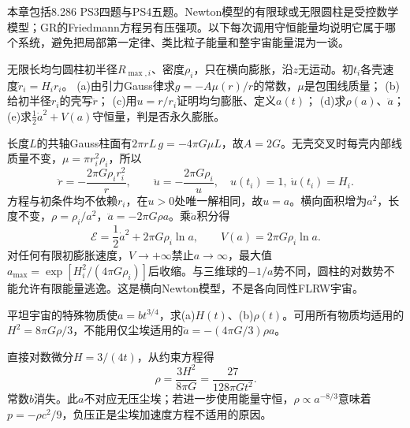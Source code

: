 本章包括8.286 PS3四题与PS4五题。Newton模型的有限球或无限圆柱是受控数学模型；GR的Friedmann方程另有压强项。以下每次调用守恒能量均说明它属于哪个系统，避免把局部第一定律、类比粒子能量和整宇宙能量混为一谈。

\begin{exercise}
无限长均匀圆柱初半径$R_{\max,i}$、密度$\rho_i$，只在横向膨胀，沿$z$无运动。初$t_i$各壳速度$\dot r_i=H_i r_i$。
(a)由引力Gauss律求$g=-A\mu(r)/r$的常数，$\mu$是包围线质量；
(b)给初半径$r_i$的壳写$\ddot r$；
(c)用$u=r/r_i$证明均匀膨胀、定义$a(t)$；
(d)求$\rho(a)$、$\ddot a$；
(e)求$\tfrac12\dot a^2+V(a)$守恒量，判是否永久膨胀。
\end{exercise}
\begin{solution}
长度$L$的共轴Gauss柱面有$2\pi rL\,g=-4\pi G\mu L$，故$A=2G$。无壳交叉时每壳内部线质量不变，$\mu=\pi r_i^2\rho_i$，所以
\[
 \ddot r=-\frac{2\pi G\rho_i r_i^2}{r},\qquad
 \ddot u=-\frac{2\pi G\rho_i}{u},\quad
 u(t_i)=1,\ \dot u(t_i)=H_i.
\]
方程与初条件均不依赖$r_i$，在$u>0$处唯一解相同，故$u=a$。横向面积增为$a^2$，长度不变，$\rho=\rho_i/a^2$，$\ddot a=-2\pi G\rho a$。乘$\dot a$积分得
\[
 \mathcal E=\frac12\dot a^2+2\pi G\rho_i\ln a,\qquad
 V(a)=2\pi G\rho_i\ln a.
\]
对任何有限初膨胀速度，$V\to+\infty$禁止$a\to\infty$，最大值$a_{\max}=\exp[H_i^2/(4\pi G\rho_i)]$后收缩。与三维球的$-1/a$势不同，圆柱的对数势不能允许有限能量逃逸。这是横向Newton模型，不是各向同性FLRW宇宙。
\end{solution}

\begin{exercise}
平坦宇宙的特殊物质使$a=bt^{3/4}$，求(a)$H(t)$、(b)$\rho(t)$。可用所有物质均适用的$H^2=8\pi G\rho/3$，不能用仅尘埃适用的$\ddot a=-(4\pi G/3)\rho a$。
\end{exercise}
\begin{solution}
直接对数微分$H=3/(4t)$，从约束方程得
\[
 \rho=\frac{3H^2}{8\pi G}=\frac{27}{128\pi Gt^2}.
\]
常数$b$消失。此$a$不对应无压尘埃；若进一步使用能量守恒，$\rho\propto a^{-8/3}$意味着$p=-\rho c^2/9$，负压正是尘埃加速度方程不适用的原因。
\end{solution}

